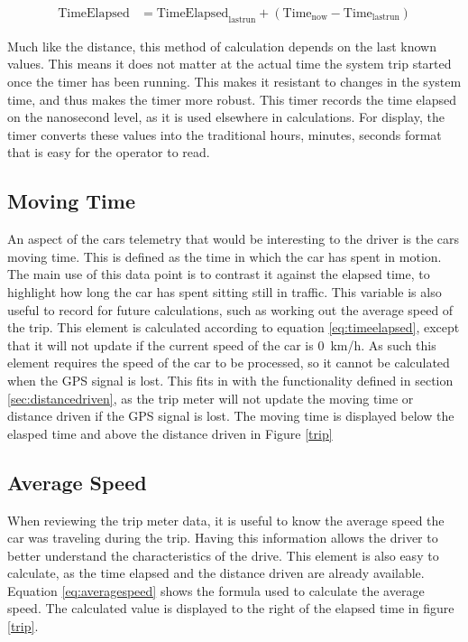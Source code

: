 \begin{align}
\label{eq:timeelapsed}
\mathrm{TimeElapsed} &=\mathrm{TimeElapsed}_\mathrm{lastrun} + (\mathrm{Time}_\mathrm{now}-\mathrm{Time}_\mathrm{lastrun})
\end{align}

Much like the distance, this method of calculation depends on the last known values. This means it does not matter at the actual time the system trip started once the timer has been running. This makes it resistant to changes in the system time, and thus makes the timer more robust. 
This timer records the time elapsed on the nanosecond level, as it is used elsewhere in calculations. For display, the timer converts these values into the traditional hours, minutes, seconds format that is easy for the operator to read.

\subsection{ Moving Time}

An aspect of the cars telemetry that would be interesting to the driver is the cars moving time. This is defined as the time in which the car has spent in motion. The main use of this data point is to contrast it against the elapsed time, to highlight how long the car has spent sitting still in traffic. This variable is also useful to record for future calculations, such as working out the average speed of the trip. This element is calculated according to equation \ref{eq:timeelapsed}, except that it will not update if the current speed of the car is 0~km/h. As such this element requires the speed of the car to be processed, so it cannot be calculated when the GPS signal is lost. This fits in with the functionality defined in section \ref{sec:distancedriven}, as the trip meter will not update the moving time or distance driven if the GPS signal is lost. The moving time is displayed below the elasped time and above the distance driven in Figure \ref{trip}

\subsection{Average Speed}

When reviewing the trip meter data, it is useful to know the average speed the car was traveling during the trip. Having this information allows the driver to better understand the characteristics of the drive. This element is also easy to calculate, as the time elapsed and the distance driven are already available. Equation \ref{eq:averagespeed} shows the formula used to calculate the average speed. The calculated value is displayed to the right of the elapsed time in figure \ref{trip}.

